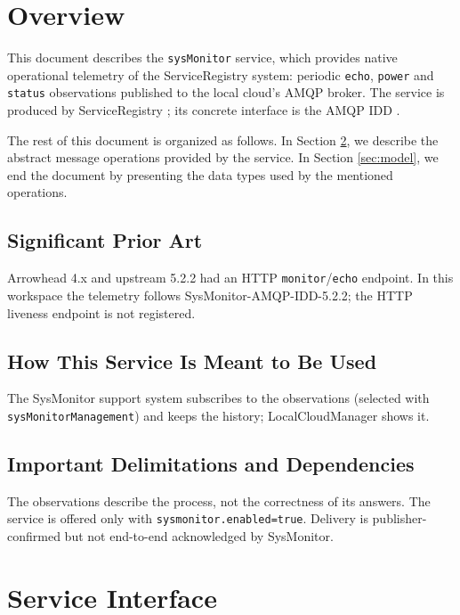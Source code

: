 \documentclass[a4paper]{arrowhead}
\begin{document}
\section{Overview}
\label{sec:overview}

This document describes the \texttt{sysMonitor} service, which provides native operational telemetry of the ServiceRegistry system: periodic \texttt{echo}, \texttt{power} and \texttt{status} observations published to the local cloud's AMQP broker.
The service is produced by ServiceRegistry \cite{sr-sysd}; its concrete interface is the AMQP IDD \cite{sr-sysMonitor-amqp-idd}.

The rest of this document is organized as follows.
In Section \ref{sec:operations}, we describe the abstract message operations provided by the service.
In Section \ref{sec:model}, we end the document by presenting the data types used by the mentioned operations.

\subsection{Significant Prior Art}

Arrowhead 4.x and upstream 5.2.2 had an HTTP \texttt{monitor}/\texttt{echo} endpoint. In this workspace the telemetry follows SysMonitor-AMQP-IDD-5.2.2; the HTTP liveness endpoint is not registered.

\subsection{How This Service Is Meant to Be Used}

The SysMonitor support system subscribes to the observations (selected with \texttt{sys\allowbreak{}Monitor\allowbreak{}Management}) and keeps the history; LocalCloudManager shows it.

\subsection{Important Delimitations and Dependencies}
\label{sec:delimitations}

The observations describe the process, not the correctness of its answers. The service is offered only with \texttt{sysmonitor.\allowbreak{}enabled=\allowbreak{}true}. Delivery is publisher-confirmed but not end-to-end acknowledged by SysMonitor.

\newpage

\section{Service Interface}
\label{sec:operations}
\end{document}
